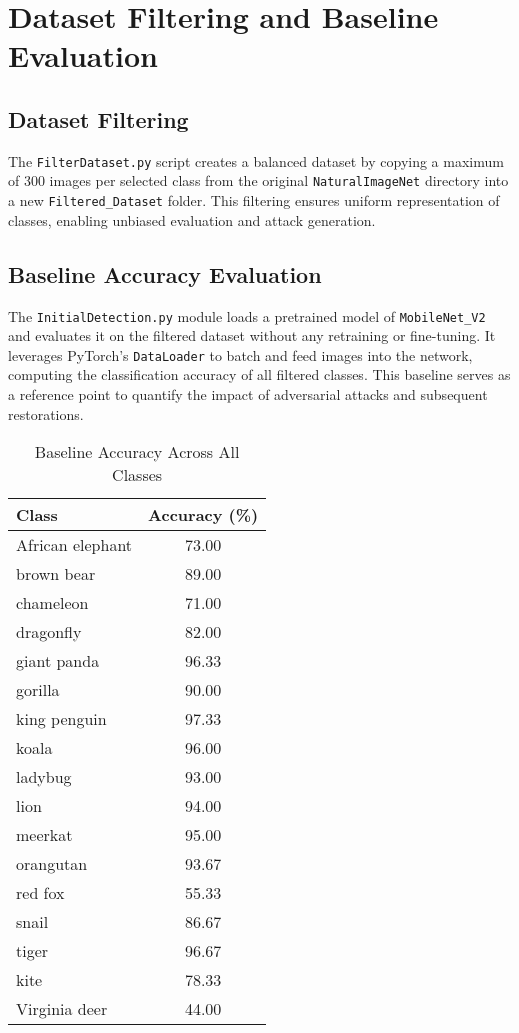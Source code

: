 \documentclass[a4paper,12pt]{report}
\begin{document}
\newpage

\chapter{Dataset Filtering and Baseline Evaluation}
\section{Dataset Filtering}
The \texttt{FilterDataset.py} script creates a balanced dataset by copying a maximum of 300 images per selected class from the original \texttt{NaturalImageNet} directory into a new \texttt{Filtered\_Dataset} folder. This filtering ensures uniform representation of classes, enabling unbiased evaluation and attack generation.

\section{Baseline Accuracy Evaluation}
The \texttt{InitialDetection.py} module loads a pretrained model of \texttt{MobileNet\_V2} and evaluates it on the filtered dataset without any retraining or fine-tuning. It leverages PyTorch's \texttt{DataLoader} to batch and feed images into the network, computing the classification accuracy of all filtered classes. This baseline serves as a reference point to quantify the impact of adversarial attacks and subsequent restorations.

\begin{table}[H]
\centering
\caption{Baseline Accuracy Across All Classes}
\begin{tabular}{|l|c|}
\hline
\textbf{Class} & \textbf{Accuracy (\%)} \\
\hline
African elephant & 73.00 \\
brown bear & 89.00 \\
chameleon & 71.00 \\
dragonfly & 82.00 \\
giant panda & 96.33 \\
gorilla & 90.00 \\
king penguin & 97.33 \\
koala & 96.00 \\
ladybug & 93.00 \\
lion & 94.00 \\
meerkat & 95.00 \\
orangutan & 93.67 \\
red fox & 55.33 \\
snail & 86.67 \\
tiger & 96.67 \\
kite & 78.33 \\
Virginia deer & 44.00 \\
\hline
\end{tabular}
\end{table}
\end{document}
